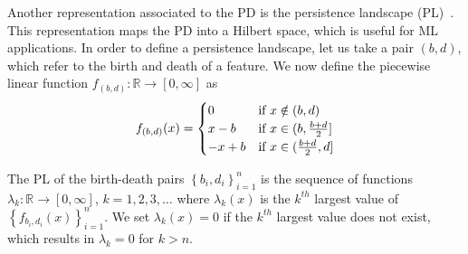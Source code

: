 \documentclass{article}
\begin{document}
Another representation associated to the PD is the persistence landscape (PL)~\citep{bubenik2015statistical, bubenik2020persistence}. This representation maps the PD into a Hilbert space, which is useful for ML applications. In order to define a persistence landscape, let us take a pair $(b,d)$, which refer to the birth and death of a feature. We now define the piecewise linear function $f_{(b,d)}:\mathbb{R} \to [0, \infty]$ as
\begin{equation}
  \label{eq:piecewise_linear_landscape}
  f_{(b,d)}(x)=
  \begin{cases}
    0 & \text{if }x \notin (b,d)\\
    x-b & \text{if }x\in (b,{b+d\over 2}]\\
    -x+b & \text{if }x\in ({b+d\over 2},d]
  \end{cases}
\end{equation}

The PL of the birth-death pairs $\left\{b_i,d_i\right\}_{i=1}^{n}$ is the sequence of functions $\lambda_k:\mathbb{R}\to [0,\infty]$, $k=1,2,3,\ldots$ where $\lambda_k(x)$ is the $k^{th}$ largest value of $\left\{f_{b_i, d_i}(x)\right\}^{n}_{i=1}$. We set $\lambda_k(x)=0$ if the $k^{th}$ largest value does not exist, which results in $\lambda_k=0$ for $k>n$. %

\end{document}

